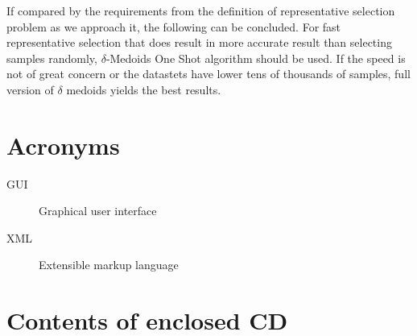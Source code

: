 \documentclass[thesis=B,english]{FITthesis}[2012/10/20]
\begin{document}

If compared by the requirements from the definition of representative selection problem as we approach it, the following can be concluded.
For fast representative selection that does result in more accurate result than selecting samples randomly, $\delta$-Medoids One Shot algorithm should be used.
If the speed is not of great concern or the datastets have lower tens of thousands of samples, full version of $\delta$ medoids yields the best results.




\appendix

\chapter{Acronyms}
\begin{description}
	\item[GUI] Graphical user interface
	\item[XML] Extensible markup language
\end{description}


\chapter{Contents of enclosed CD}


\begin{figure}
\end{figure}
\end{document}
